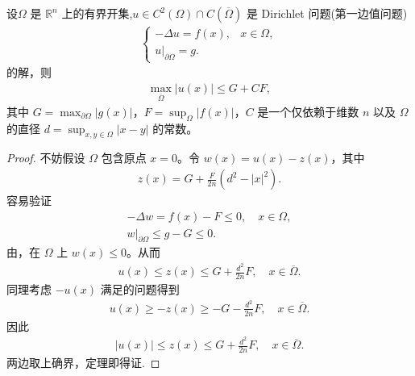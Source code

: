 \documentclass[../../main.tex]{subfiles}%
\begin{document}
\begin{theorem}\label{theorem:Dirichlet问题的解的最大模估计}
设$\Omega$ 是 $\mathbb{R}^n$ 上的有界开集,$u\in C^2(\Omega)\cap C(\overline{\Omega})$ 是 Dirichlet 问题(第一边值问题)
\begin{align}
\begin{cases}
-\Delta u = f(x), & x\in\Omega, \\
u|_{\partial\Omega} = g.
\end{cases} \label{eq:dirichlet-max}
\end{align}
的解，则
\begin{align*}
\max_{\overline{\Omega}} |u(x)| \leqslant G + CF, 
\end{align*}
其中 $G=\max_{\partial\Omega}|g(x)|$，$F=\sup_{\Omega}|f(x)|$，$C$ 是一个仅依赖于维数 $n$ 以及 $\Omega$ 的直径 $d=\sup_{x,y\in\Omega}|x-y|$ 的常数。
\end{theorem}

\begin{proof}
不妨假设 $\Omega$ 包含原点 $x=0$。令 $w(x)=u(x)-z(x)$，其中
\begin{align*}
z(x) = G + \frac{F}{2n}(d^2 - |x|^2).
\end{align*}
容易验证
\begin{gather*}
-\Delta w = f(x) - F \leqslant 0, \quad x\in\Omega, \\
w|_{\partial\Omega} \leqslant g - G \leqslant 0.
\end{gather*}
由，在 $\Omega$ 上 $w(x)\leqslant 0$。从而
\begin{align*}
u(x) \leqslant z(x) \leqslant G + \frac{d^2}{2n}F, \quad x\in\overline{\Omega}.
\end{align*}
同理考虑 $-u(x)$ 满足的问题得到
\begin{align*}
u(x) \geqslant -z(x) \geqslant -G - \frac{d^2}{2n}F, \quad x\in\overline{\Omega}.
\end{align*}
因此
\begin{align*}
|u(x)| \leqslant z(x) \leqslant G + \frac{d^2}{2n}F, \quad x\in\overline{\Omega}.
\end{align*}
两边取上确界，定理即得证.
\end{proof}
\end{document}
